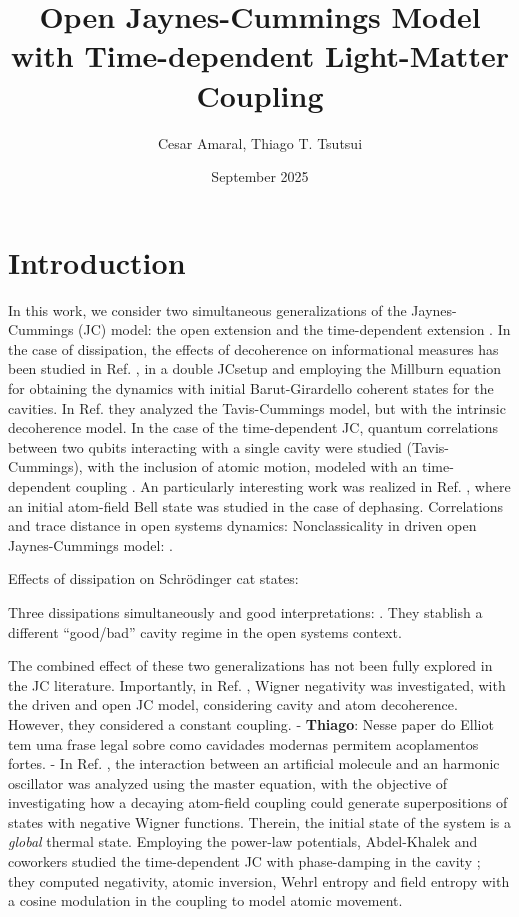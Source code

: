 \documentclass{article}
\title{Open Jaynes-Cummings Model with Time-dependent Light-Matter Coupling}
\author{Cesar Amaral, Thiago T. Tsutsui}
\date{September 2025}
\newcommand{\revision}[1]{{\color{red}{#1}}}
\newcommand{\ts}[1]{{\color{red}- \textbf{Thiago}: #1 - }}
\begin{document}
\maketitle

\section{Introduction}
In this work, we consider two simultaneous generalizations of the Jaynes-Cummings (JC) model: the open extension \cite{Barnett1986,Puri1988} and the time-dependent extension \cite{Schlicher1989,DeCastro2023}.
In the case of dissipation, 
the effects of decoherence on informational measures has been studied in Ref. \cite{Mohamed2025}, in a double JC\revision{, two qubits and two cavities, }setup and employing the Millburn equation for obtaining the dynamics with initial
Barut-Girardello coherent states for the cavities.
In Ref. \cite{Mohamed2019} they analyzed the Tavis-Cummings model, but with the intrinsic decoherence model.
In the case of the time-dependent JC, quantum correlations between two qubits interacting with a single cavity were studied (Tavis-Cummings), with the inclusion of atomic motion, modeled with an time-dependent coupling \cite{Abdel-Khalek2016a,Algarni2017}.
An particularly interesting work was realized in Ref. \cite{Rendell2003}, where an initial atom-field Bell state was studied in the case of dephasing. 
Correlations and trace distance in open systems dynamics: \cite{Smirne2010}
Nonclassicality in driven open Jaynes-Cummings model: \cite{Clemens2000}.

Effects of dissipation on Schr\"odinger cat states: \cite{Walls1985,Phoenix1990,Kim1992}

Three dissipations simultaneously and good interpretations: \cite{Auffeves2010}. 
They stablish a different ``good/bad'' cavity regime in the open systems context.

The combined effect of these two generalizations has not been fully explored in the JC literature. 
Importantly, in Ref. \cite{Elliott2024}, Wigner negativity was investigated, with the driven and open JC model, considering cavity and atom decoherence.
However, they considered a constant coupling. 
\ts{Nesse paper do Elliot tem uma frase legal sobre como cavidades modernas permitem acoplamentos fortes.}
In Ref. \cite{Kolar2024}, the interaction between an artificial molecule and an harmonic oscillator was analyzed using the \revision{Bloch-Redfield} master equation, with the objective of investigating how a decaying atom-field coupling could generate superpositions of states with negative Wigner functions.
Therein, the initial state of the system is a \emph{global} thermal state. 
Employing the power-law potentials, Abdel-Khalek and coworkers studied the time-dependent JC with phase-damping in the cavity \cite{Abdel-Khalek2016b}; they computed negativity, atomic inversion, Wehrl entropy and field entropy with a cosine modulation in the coupling to model atomic movement.
\end{document}
